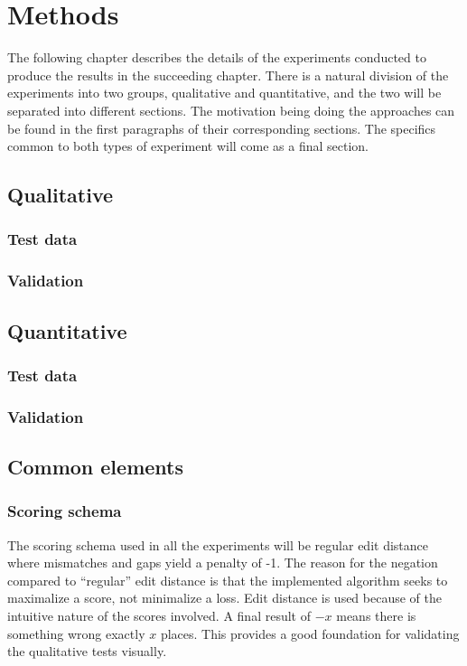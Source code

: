 \documentclass[thesis.tex]{subfiles}
\begin{document}
\chapter{Methods}
The following chapter describes the details of the experiments conducted to produce the results in the succeeding chapter. There is a natural division of the experiments into two groups, qualitative and quantitative, and the two will be separated into different sections. The motivation being doing the approaches can be found in the first paragraphs of their corresponding sections. The specifics common to both types of experiment will come as a final section. 
\section{Qualitative}
\subsection{Test data}
\subsection{Validation}
\section{Quantitative}
\subsection{Test data}
\subsection{Validation}
\section{Common elements}
\subsection{Scoring schema}
The scoring schema used in all the experiments will be regular edit distance where mismatches and gaps yield a penalty of -1. The reason for the negation compared to ``regular'' edit distance is that the implemented algorithm seeks to maximalize a score, not minimalize a loss. Edit distance is used because of the intuitive nature of the scores involved. A final result of $-x$ means there is something wrong exactly $x$ places. This provides a good foundation for validating the qualitative tests visually.
\end{document}
